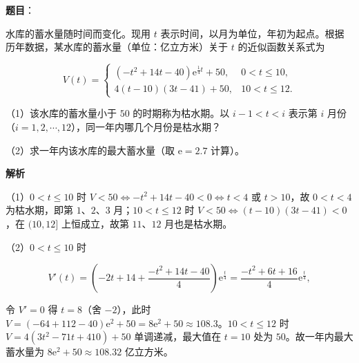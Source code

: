 \begin{answer}

\textbf{题目}：

水库的蓄水量随时间而变化。现用 $t$ 表示时间，以月为单位，年初为起点。根据历年数据，某水库的蓄水量（单位：亿立方米）关于 $t$ 的近似函数关系式为

\nopagebreak[4]
\[V(t)=\begin{cases}(-t^2+14t-40)\mathrm e^{\frac14t}+50,&0<t\leqslant10,\\ 4(t-10)(3t-41)+50,&10<t\leqslant12.\end{cases}\]

（1）该水库的蓄水量小于 $50$ 的时期称为枯水期。以 $i-1<t<i$ 表示第 $i$ 月份（$i=1,2,\cdots,12$），同一年内哪几个月份是枯水期？

（2）求一年内该水库的最大蓄水量（取 $\mathrm e=2.7$ 计算）。

\textbf{解析}

（1）$0<t\leqslant10$ 时 $V<50\iff -t^2+14t-40<0\iff t<4$ 或 $t>10$，故 $0<t<4$ 为枯水期，即第 $1$、$2$、$3$ 月；$10<t\leqslant12$ 时 $V<50\iff (t-10)(3t-41)<0$，在 $(10,12]$ 上恒成立，故第 $11$、$12$ 月也是枯水期。

（2）$0<t\leqslant10$ 时

\nopagebreak[4]
\[V'(t)=\left(-2t+14+\frac{-t^2+14t-40}4\right)\mathrm e^{\frac t4}=\frac{-t^2+6t+16}4\mathrm e^{\frac t4},\]

令 $V'=0$ 得 $t=8$（舍 $-2$），此时 $V=(-64+112-40)\mathrm e^2+50=8\mathrm e^2+50\approx108.3$。$10<t\leqslant12$ 时 $V=4(3t^2-71t+410)+50$ 单调递减，最大值在 $t=10$ 处为 $50$。故一年内最大蓄水量为 $8\mathrm e^2+50\approx108.32$ 亿立方米。


\end{answer}
